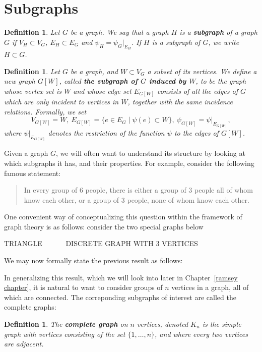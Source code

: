 \documentclass[12pt]{report}
\theoremstyle{plain}
\newtheorem{defn}[thm]{Definition}
\newcommand{\Xb}[1]{\textbf{#1}\index{#1}}
\begin{document}
\section{Subgraphs}

\begin{defn}
Let $G$ be a graph. We say that a graph $H$ is a \Xb{subgraph} of a graph
$G$ if $V_H \subset V_G$, $E_H \subset E_G$ and $\psi_H = \psi_G|_{E_H}$.
If $H$ is a subgraph of $G$, we write $H \subset G$.
\end{defn}

\begin{defn}
Let $G$ be a graph, and $W \subset V_G$ a subset of its vertices. We
define a new graph $G[W]$, called \textbf{the subgraph of $G$ induced by
$W$}, to be the graph whose vertex set is $W$ and
whose edge set $E_{G[W]}$ consists of all the edges of $G$ which are only
incident to vertices in $W$, together with the same incidence relations.
Formally, we set
\[ V_{G[W]} = W, \ E_{G[W]} = \{ e \in E_G \mid \psi(e) \subset W\}, \
\psi_{G[W]} = \psi|_{E_{G[W]}},\]
where $\psi|_{E_{G[W]}}$ denotes the restriction of the function $\psi$ to
the edges of $G[W]$.
\end{defn}

Given a graph $G$, we will often want to understand its structure by
looking at which subgraphs it has, and their properties. For example,
consider the following famous statement:

\begin{quote}
In every group of $6$ people, there is either a group of $3$ people all of
whom know each other, or a group of $3$ people, none of whom know each
other.
\end{quote}

One convenient way of conceptualizing this question within the framework of
graph theory is as follows: consider the two special graphs below

TRIANGLE   \ \ \ \ \ \ DISCRETE GRAPH WITH 3 VERTICES

We may now formally state the previous result as follows:

In generalizing this result, which we will look into later in
Chapter~\ref{ramsey chapter}, it is natural to want to consider groups of
$n$ vertices in a graph, all of which are connected. The correponding
subgraphs of interest are called the complete graphs:

\begin{defn}
The \Xb{complete graph} on $n$ vertices, denoted $K_n$ is the simple graph
with vertices consisting of the set $\{1, \ldots, n\}$, and where every two
vertices are adjacent.
\end{defn}
\end{document}
